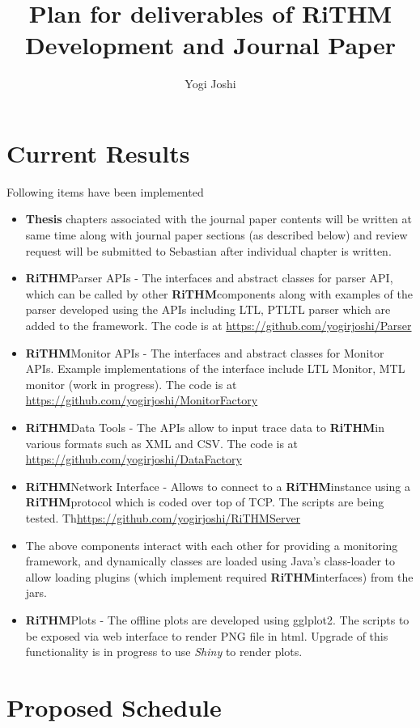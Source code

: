 \documentclass[]{article}
\title{ Plan for deliverables of \textbf{RiTHM} Development and Journal Paper}
\author{Yogi Joshi}
\newcommand{\rithm}{\textbf{RiTHM}\space}
\begin{document}
\maketitle

\section{Current Results}
Following items have been implemented
\begin{itemize}
	\item
	\textbf{Thesis} chapters associated with the journal paper contents will be written at same time along with journal paper sections (as described below) and review request will be submitted to Sebastian after individual chapter is written.
	\item \rithm Parser APIs - The interfaces and abstract classes for parser API, which can be called by other \rithm components along with examples of the parser developed using the APIs  including LTL, PTLTL parser which are added to the framework. The code is at \url{https://github.com/yogirjoshi/Parser}
	\item \rithm Monitor APIs - The interfaces and abstract classes for Monitor APIs. Example implementations of the interface include LTL Monitor, MTL monitor (work in progress). The code is at \url{https://github.com/yogirjoshi/MonitorFactory}	
	\item \rithm Data Tools - The APIs allow to input trace data to \rithm in various formats such as XML and CSV. The code is at \url{https://github.com/yogirjoshi/DataFactory}
	\item \rithm Network Interface - Allows to connect to a \rithm instance using a \rithm protocol which is coded over top of TCP. The scripts are being tested. Th\url{https://github.com/yogirjoshi/RiTHMServer}
	\item The above components interact with each other for providing a monitoring framework, and dynamically classes are loaded using Java's class-loader to allow loading plugins (which implement required \rithm interfaces) from the jars. 
	\item \rithm Plots - The offline plots are developed using gglplot2. The scripts to be exposed via web interface to render PNG file in html. Upgrade of this functionality is in progress to use \textit{Shiny} to render plots.

\end{itemize}
\section{Proposed Schedule}
\end{document}
